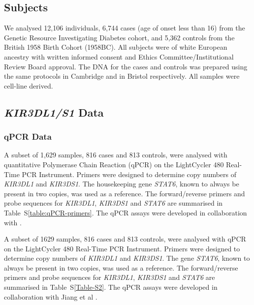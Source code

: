 \subsection*{Subjects}

We analysed 12,106 individuals, 6,744 cases (age of onset less than 16) from the Genetic Resource Investigating Diabetes cohort,
and 5,362 controls from the British 1958 Birth Cohort (1958BC).
All subjects were of white European ancestry with written informed consent and Ethics Committee/Institutional Review Board approval.
The DNA for the cases and controls was prepared using the same protocols in Cambridge and in Bristol respectively.
All samples were cell-line derived.


\subsection{\emph{KIR3DL1/S1} Data}


\subsubsection*{qPCR Data}

A subset of 1,629 samples, 816 cases and 813 controls, were analysed with quantitative Polymerase Chain Reaction (qPCR) on the LightCycler 480 Real-Time PCR Instrument.
Primers were designed to determine copy numbers of \emph{KIR3DL1} and \emph{KIR3DS1}.
The housekeeping gene \emph{STAT6}, known to always be present in two copies, was used as a reference.
The forward/reverse primers and probe sequences for \emph{KIR3DL1}, \emph{KIR3DS1} and \emph{STAT6} are summarised in Table~S\ref{table:qPCR-primers}.
The qPCR assays were developed in collaboration with \citet{Jiang:2012cf}.

A subset of 1629 samples, 816 cases and 813 controls, were analysed
with qPCR on the LightCycler
480 Real-Time PCR Instrument.  Primers were designed to determine copy
numbers of \emph{KIR3DL1} and \emph{KIR3DS1}.  The gene
\emph{STAT6}, known to always be present in two copies, was used as a
reference.  The forward/reverse primers and probe sequences for
\emph{KIR3DL1}, \emph{KIR3DS1} and \emph{STAT6} are summarised in
Table~S\ref{Table-S2}.  The qPCR assays were developed in
collaboration with Jiang et al \cite{Jiang:2012cf}.

